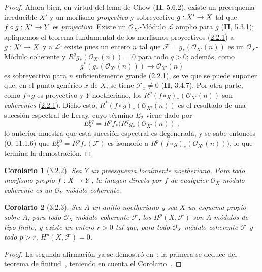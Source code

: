 \documentclass[10pt,oneside,openany]{book}
\theoremstyle{egaenv}\newtheorem*{env}{---}
\theoremstyle{egastatement}
\newtheorem*{corollary}{Corolario}
\theoremstyle{egadescription}
\renewcommand{\to}{\mathchoice{\longrightarrow}{\rightarrow}{\rightarrow}{\rightarrow}}
\begin{document}
\begin{proof}
Ahora bien, en virtud del lema de Chow (\textbf{II}, 5.6.2), existe un preesquema
irreducible $X'$ y un morfismo \emph{proyectivo} y sobreyectivo
$g:X'\to X$ tal que $f\circ g:X'\to Y$ es \emph{proyectivo}. Existe un
$\mathcal O_{X'}$-Módulo $\mathcal L$ amplio para $g$ (\textbf{II}, 5.3.1);
apliquemos el teorema fundamental de los morfismos proyectivos
(\hyperref[III.2.2.1-fr]{2.2.1}) a $g:X'\to X$ y a $\mathcal L$:
existe pues un entero $n$ tal que
$\mathcal F=g_*(\mathcal O_{X'}(n))$ es un $\mathcal O_X$-Módulo coherente
y $R^qg_*(\mathcal O_{X'}(n))=0$ para todo $q>0$; además, como
\[
g^*(g_*(\mathcal O_{X'}(n)))\longrightarrow\mathcal O_{X'}(n)
\]
es sobreyectivo para $n$ suficientemente grande (\hyperref[III.2.2.1-fr]{2.2.1}), se
ve que se puede suponer que, en el punto genérico $x$ de $X$, se tiene
$\mathcal F_x\neq0$ (\textbf{II}, 3.4.7). Por otra parte, como $f\circ g$ es
proyectivo y $Y$ noetheriano, los
$R^p(f\circ g)_*(\mathcal O_{X'}(n))$ son \emph{coherentes}
(\hyperref[III.2.2.1-fr]{2.2.1}). Dicho esto,
$R^*(f\circ g)_*(\mathcal O_{X'}(n))$ es el resultado de una sucesión
espectral de Leray, cuyo término $E_2$ viene dado por
\[
E_2^{pq}=R^pf_*(R^qg_*(\mathcal O_{X'}(n))~;
\]
lo anterior muestra que esta sucesión espectral es degenerada, y se sabe
entonces (\textbf{0}, 11.1.6) que $E_2^{p0}=R^pf_*(\mathcal F)$ es isomorfo a
$R^p(f\circ g)_*(\mathcal O_{X'}(n)))$, lo que termina la demostración.
\end{proof}

\begin{corollary}[3.2.2]
\label{III.3.2.2}
\label{III.3.2.2-fr}
Sea $Y$ un preesquema localmente noetheriano.
Para todo morfismo propio $f:X\to Y$, la imagen directa por $f$ de cualquier $\mathcal O_X$-módulo coherente es un $\mathcal O_Y$-módulo coherente.
\end{corollary}

\begin{corollary}[3.2.3]
\label{III.3.2.3}
\label{III.3.2.3-fr}
Sea $A$ un anillo noetheriano y sea $X$ un esquema propio sobre $A$; para todo $\mathcal O_X$-módulo coherente $\mathcal F$, los $H^p(X,\mathcal F)$ son $A$-módulos de tipo finito, y existe un entero $r>0$ tal que, para todo $\mathcal O_X$-módulo coherente $\mathcal F$ y todo $p>r$, $H^p(X,\mathcal F)=0$.
\end{corollary}

\begin{proof}
La segunda afirmación ya se demostró en~; la primera se deduce del teorema de finitud~, teniendo en cuenta el Corolario~.
\end{proof}
\end{document}
